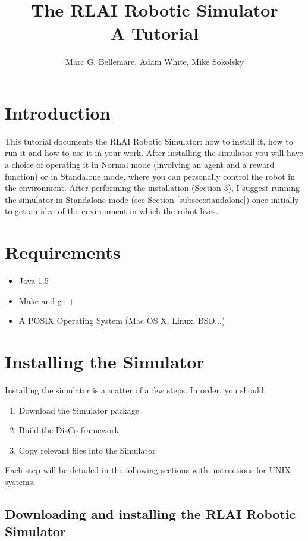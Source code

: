 \documentclass[12pt]{article}
\author{Marc G. Bellemare, Adam White, Mike Sokolsky}
\title{The RLAI Robotic Simulator\\ A Tutorial}
\begin{document}
\maketitle
\tableofcontents

\section{Introduction}

This tutorial documents the RLAI Robotic Simulator: how to install it, how
to run it and how to use it in your work. After installing the simulator
you will have a choice of operating it in Normal mode (involving an agent
and a reward function) or in Standalone mode, where you can personally 
control the robot in the environment. After performing the installation
(Section \ref{sec:installation}),  I suggest running the simulator in 
Standalone mode (see Section \ref{subsec:standalone}) once initially to get
an idea of the environment in which the robot lives. 

\section{Requirements}

\begin{itemize}
\item{Java 1.5}
\item{Make and g++}
\item{A POSIX Operating System (Mac OS X, Linux, BSD...)}
\end{itemize}

\section{Installing the Simulator}\label{sec:installation}

Installing the simulator is a matter of a few steps. In order, you should:

\begin{enumerate}
\item{Download the Simulator package}
\item{Build the DisCo framework}
\item{Copy relevant files into the Simulator}
\end{enumerate}

Each step will be detailed in the following sections with instructions for
UNIX systems.

\subsection{Downloading and installing the RLAI Robotic Simulator}
\end{document}
